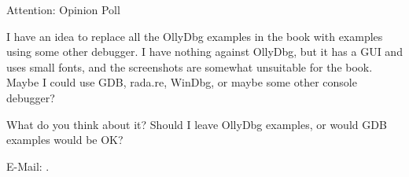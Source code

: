 \huge Attention: Opinion Poll
\normalsize

\bigskip
\bigskip
\bigskip

I have an idea to replace all the OllyDbg examples in the book with examples using some other debugger.
I have nothing against OllyDbg, but it has a GUI and uses small fonts, and the screenshots are somewhat unsuitable for the book.
Maybe I could use GDB, rada.re, WinDbg, or maybe some other console debugger?

What do you think about it?
Should I leave OllyDbg examples, or would GDB examples would be OK?

E-Mail: \GTT{\EMAIL}.

\vspace*{\fill}
\vfill
